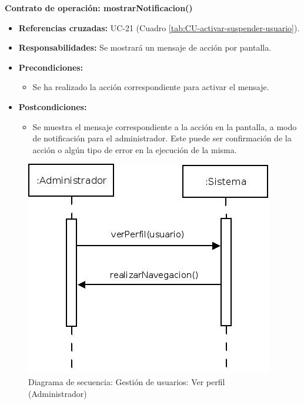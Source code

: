 \textbf{Contrato de operación: mostrarNotificacion()}
\begin{itemize}
\item \textbf{Referencias cruzadas:} UC-21 (Cuadro \ref{tab:CU-activar-suspender-usuario}).
\item \textbf{Responsabilidades:} Se mostrará un mensaje de acción por pantalla.
\item \textbf{Precondiciones:} 
 \begin{itemize}
\item Se ha realizado la acción correspondiente para activar el mensaje.
\end {itemize}
\item \textbf{Postcondiciones:} 
 \begin{itemize}
\item Se muestra el mensaje correspondiente a la acción en la pantalla, a modo de notificación para el administrador. Este puede ser confirmación de la acción o algún tipo de error en la ejecución de la misma.
\end {itemize}
\end {itemize}


\vspace{10mm}

\begin{figure}[H]
\centering
  \includegraphics[scale=.55]{img/secuencias/gestion-usuarios-ver-perfil.jpeg}
  \caption{Diagrama de secuencia: Gestión de usuarios: Ver perfil (Administrador)}
  \label{fig:secuencia-gestion-usuarios-ver-perfil}
\end{figure}

